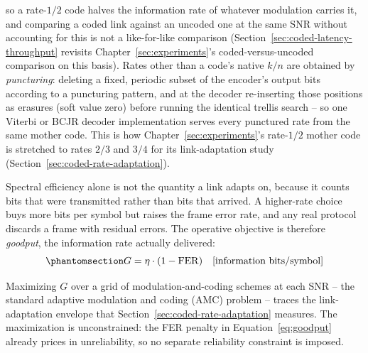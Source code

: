so a rate-$1/2$ code halves the information rate of whatever modulation carries it, and comparing a coded link against an uncoded one at the same SNR without accounting for this is not a like-for-like comparison (Section~\ref{sec:coded-latency-throughput} revisits Chapter~\ref{sec:experiments}'s coded-versus-uncoded comparison on this basis). Rates other than a code's native $k/n$ are obtained by \emph{puncturing}: deleting a fixed, periodic subset of the encoder's output bits according to a puncturing pattern, and at the decoder re-inserting those positions as erasures (soft value zero) before running the identical trellis search -- so one Viterbi or BCJR decoder implementation serves every punctured rate from the same mother code. This is how Chapter~\ref{sec:experiments}'s rate-$1/2$ mother code is stretched to rates $2/3$ and $3/4$ for its link-adaptation study (Section~\ref{sec:coded-rate-adaptation}).

Spectral efficiency alone is not the quantity a link adapts on, because it counts bits that were transmitted rather than bits that arrived. A higher-rate choice buys more bits per symbol but raises the frame error rate, and any real protocol discards a frame with residual errors. The operative objective is therefore \emph{goodput}, the information rate actually delivered:
\begin{equation}\protect\phantomsection\label{eq:goodput}{G = \eta \cdot (1 - \mathrm{FER}) \quad \text{[information bits/symbol]}}\end{equation}

Maximizing $G$ over a grid of modulation-and-coding schemes at each SNR -- the standard adaptive modulation and coding (AMC) problem -- traces the link-adaptation envelope that Section~\ref{sec:coded-rate-adaptation} measures. The maximization is unconstrained: the FER penalty in Equation~\ref{eq:goodput} already prices in unreliability, so no separate reliability constraint is imposed.
